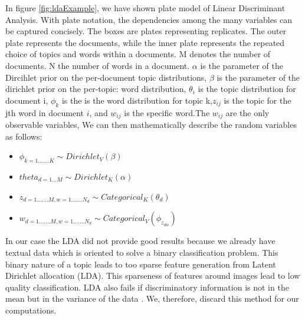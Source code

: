 In figure \ref{fig:ldaExample}, we have shown plate model of Linear 
Discriminant Analysis. With plate notation, the dependencies among the many variables can be captured concisely. The boxes are plates representing replicates. The outer plate represents the documents, while the inner plate represents the repeated choice of topics and words within a documents. M denotes the number of documents. N the number of words in a document. $\alpha$ is the parameter of the Dircihlet prior on the per-document topic distributions, $\beta$ is the parameter of the dirichlet prior on the per-topic: word distribution, $\theta_i$ is the topic distribution for document i, $\phi_k$ is the is the word distribution for topic k,$z_{ij}$ is the topic for the jth word in document $i$, and $w_{ij}$ is the specific word.The $w_{ij}$ are the only observable variables, We can then mathematically describe the random variables as follows:

\begin{itemize}
\item $\phi_{k=1.......K} \sim Dirichlet_V(\beta)$\\
\item $theta_{d=1 \dots M} \sim Dirichlet_K(\alpha)$ \\
\item $z_{d=1.......M,w=1....... N_d} \sim Categorical_K(\theta_d)$ \\
\item $w_{d=1 ....... M,w=1....... N_d} \sim Categorical_V(\phi_{z_{dw}})$ \\
\end{itemize}


In our case the LDA did not provide good results because we 
already have textual data which is oriented to solve a binary 
classification problem. This binary nature of a topic leads to too 
sparse feature generation from Latent Dirichlet allocation (LDA). 
This sparseness of features around images lead to low quality 
classification. LDA also fails if discriminatory information is
not in the mean but in the variance of the data  \citet*{Blei}. We, 
therefore, discard this method for our computations.

